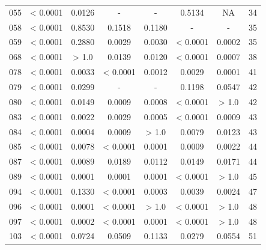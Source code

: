 {\begin{longtable}{cccccccc}
055 & {\color{red} < 0.0001} & {\color{red}0.0126} & - & - & 0.5134 & NA & 34 \\
058 & {\color{red} < 0.0001} & 0.8530 & 0.1518 & 0.1180 & - & - & 35 \\
059 & {\color{red} < 0.0001} & 0.2880 & {\color{red}0.0029} & {\color{red}0.0030} & {\color{red} < 0.0001} & {\color{red}0.0002} & 35 \\
068 & {\color{red} < 0.0001} & > 1.0 & {\color{red}0.0139} & {\color{red}0.0120} & {\color{red} < 0.0001} & {\color{red}0.0007} & 38 \\
078 & {\color{red} < 0.0001} & {\color{red}0.0033} & {\color{red} < 0.0001} & {\color{red}0.0012} & {\color{red}0.0029} & {\color{red}0.0001} & 41 \\
079 & {\color{red} < 0.0001} & {\color{red}0.0299} & - & - & 0.1198 & 0.0547 & 42 \\
080 & {\color{red} < 0.0001} & {\color{red}0.0149} & {\color{red}0.0009} & {\color{red}0.0008} & {\color{red} < 0.0001} & > 1.0 & 42 \\
083 & {\color{red} < 0.0001} & {\color{red}0.0022} & {\color{red}0.0029} & {\color{red}0.0005} & {\color{red} < 0.0001} & {\color{red}0.0009} & 43 \\
084 & {\color{red} < 0.0001} & {\color{red}0.0004} & {\color{red}0.0009} & > 1.0 & {\color{red}0.0079} & {\color{red}0.0123} & 43 \\
085 & {\color{red} < 0.0001} & {\color{red}0.0078} & {\color{red} < 0.0001} & {\color{red}0.0001} & {\color{red}0.0009} & {\color{red}0.0022} & 44 \\
087 & {\color{red} < 0.0001} & {\color{red}0.0089} & {\color{red}0.0189} & {\color{red}0.0112} & {\color{red}0.0149} & {\color{red}0.0171} & 44 \\
089 & {\color{red} < 0.0001} & {\color{red}0.0001} & {\color{red}0.0001} & {\color{red}0.0001} & {\color{red} < 0.0001} & > 1.0 & 45 \\
094 & {\color{red} < 0.0001} & {\color{red}0.1330} & {\color{red} < 0.0001} & {\color{red}0.0003} & {\color{red}0.0039} & {\color{red}0.0024} & 47 \\
096 & {\color{red} < 0.0001} & {\color{red}0.0001} & {\color{red} < 0.0001} & > 1.0 & {\color{red} < 0.0001} & > 1.0 & 48 \\
097 & {\color{red} < 0.0001} & {\color{red}0.0002} & {\color{red} < 0.0001} & {\color{red}0.0001} & {\color{red} < 0.0001} & > 1.0 & 48 \\
103 & {\color{red} < 0.0001} & 0.0724 & 0.0509 & 0.1133 & {\color{red}0.0279} & 0.0554 & 51 \\

\end{longtable}}
